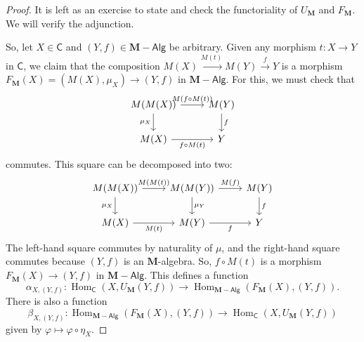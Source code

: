 \documentclass{article}
\theoremstyle{definition}
\newcommand{\C}{\mathsf{C}}
\newcommand{\Alg}{\mathsf{Alg}}
\DeclareMathOperator{\Hom}{Hom}
\begin{document}
\begin{proof}
    It is left as an exercise to state and check the functoriality of $U_{\mathbf{M}}$ and $F_{\mathbf{M}}$. We will verify the adjunction.
    
    So, let $X \in \C$ and $(Y,f) \in \mathbf{M}{-}\Alg$ be arbitrary. Given any morphism $t : X \to Y$ in $\C$, we claim that the composition $M(X) \xrightarrow{M(t)} M(Y) \xrightarrow{f} Y$ is a morphism $F_{\mathbf{M}}(X) = (M(X),\mu_X) \to (Y,f)$ in $\mathbf{M}{-}\Alg$. For this, we must check that
    \[\begin{tikzcd}[ampersand replacement=\&]
    	{M(M(X))} \& {M(Y)} \\
    	{M(X)} \& Y
    	\arrow["{M(f \circ M(t))}", from=1-1, to=1-2]
    	\arrow["{\mu_X}"', from=1-1, to=2-1]
    	\arrow["{f \circ M(t)}"', from=2-1, to=2-2]
    	\arrow["f", from=1-2, to=2-2]
    \end{tikzcd}\]
    commutes. This square can be decomposed into two:
    \[\begin{tikzcd}[ampersand replacement=\&]
    	{M(M(X))} \& {M(M(Y))} \& {M(Y)} \\
    	{M(X)} \& {M(Y)} \& Y
    	\arrow["{\mu_X}"', from=1-1, to=2-1]
    	\arrow["{M(M(t))}", from=1-1, to=1-2]
    	\arrow["{M(t)}"', from=2-1, to=2-2]
    	\arrow["{\mu_Y}", from=1-2, to=2-2]
    	\arrow["{M(f)}", from=1-2, to=1-3]
    	\arrow["f", from=1-3, to=2-3]
    	\arrow["f"', from=2-2, to=2-3]
    \end{tikzcd}\]
    The left-hand square commutes by naturality of $\mu$, and the right-hand square commutes because $(Y,f)$ is an $\mathbf{M}$-algebra. So, $f \circ M(t)$ is a morphism $F_{\mathbf{M}}(X) \to (Y,f)$ in $\mathbf{M}{-}\Alg$. This defines a function
    \[\alpha_{X,(Y,f)} : \Hom_{\C}(X,U_{\mathbf{M}}(Y,f)) \to \Hom_{\mathbf{M}{-}\Alg}(F_{\mathbf{M}}(X),(Y,f)).\]
    There is also a function
    \[\beta_{X,(Y,f)} : \Hom_{\mathbf{M}{-}\Alg}(F_{\mathbf{M}}(X),(Y,f)) \to \Hom_{\C}(X,U_{\mathbf{M}}(Y,f))\]
    given by $\varphi \mapsto \varphi \circ \eta_X$.

\end{proof}
\end{document}
